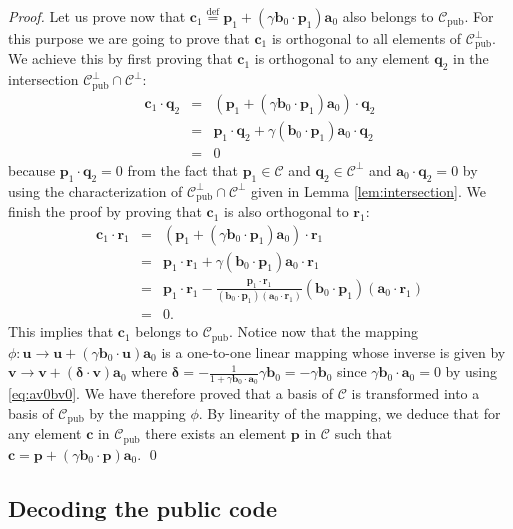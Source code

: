 \documentclass[runningheads,11pt]{llncs}
\newcommand{\eqdef}{\stackrel{\text{def}}{=}}
\newcommand{\code}[1]{\ensuremath{\mathscr{#1}}}
\newcommand{\Cpub}{\code{C}_{\text{pub}}}
\newcommand{\CC}{\code{C}}
\newcommand{\scp}[2]{#1\cdot #2}
\newcommand{\word}[1]{\ensuremath{\boldsymbol{#1}}}
\newcommand{\av}{\word{a}}
\newcommand{\bv}{\word{b}}
\newcommand{\deltav}{\word{\delta}}
\newcommand{\cv}{\word{c}}
\newcommand{\pv}{\word{p}}
\newcommand{\qv}{\word{q}}
\newcommand{\rv}{\word{r}}
\newcommand{\uv}{\word{u}}
\newcommand{\vv}{\word{v}}
\begin{document}
\begin{proof}
Let us prove now that 
$\cv_1 \eqdef \pv_1 + (\scp{\gamma \bv_0}{\pv_1}) \av_0$ also belongs to $\Cpub$.
For this purpose we are going to prove that $\cv_1$ is orthogonal to all elements of 
$\Cpub^\perp$.
We achieve this by first proving that $\cv_1$ is orthogonal to any element $\qv_2$ in the 
intersection $\Cpub^\perp \cap \CC^\perp$:
\begin{eqnarray*}
\scp{\cv_1}{\qv_2} & = & (\scp{\pv_1 + (\scp{\gamma \bv_0}{\pv_1}) \av_0)}{\qv_2}\\
& = & \scp{\pv_1}{\qv_2} + \gamma (\scp{\bv_0}{\pv_1}) \scp{\av_0}{\qv_2} \\
& = & 0
\end{eqnarray*}
because $ \scp{\pv_1}{\qv_2}=0$ from the fact that $\pv_1 \in \CC$ and $\qv_2 \in \CC^\perp$ and
$\scp{\av_0}{\qv_2}=0$ by using the characterization of $\Cpub^\perp \cap \CC^\perp$ given in 
Lemma \ref{lem:intersection}. We finish the proof
by  proving that $\cv_1$ is also orthogonal to $\rv_1$:
\begin{eqnarray*}
\scp{\cv_1}{\rv_1} &= &  \scp{(\pv_1 + (\scp{\gamma \bv_0}{\pv_1})\av_0)}{\rv_1}\\
& = & \scp{\pv_1}{\rv_1} + \gamma (\scp{\bv_0}{\pv_1}) \scp{\av_0}{\rv_1}\\
& = & \scp{\pv_1}{\rv_1} - \frac{ \scp{\pv_1}{\rv_1}}{(\scp{\bv_0}{\pv_1})(\scp{\av_0}{\rv_1})} (\scp{\bv_0}{\pv_1})( \scp{\av_0}{\rv_1})\\
& = & 0.
\end{eqnarray*}
This implies that $\cv_1$ belongs to $\Cpub$. 
Notice now that the mapping 
$\phi :\uv \rightarrow \uv + (\scp{\gamma \bv_0}{\uv})\av_0$ is a one-to-one linear mapping whose inverse is given by
$\vv \rightarrow \vv + (\scp{\deltav}{\vv}) \av_0$ where 
$\deltav = -\frac{1}{1+\scp{\gamma \bv_0}{\av_0}} \gamma \bv_0=-\gamma \bv_0$ since $\scp{\gamma \bv_0}{\av_0}=0$ by using 
\eqref{eq:av0bv0}. We have therefore proved that a basis of $\CC$ is transformed into a basis of $\Cpub$ by the mapping
$\phi$. By linearity of the mapping, we deduce that for any element $\cv$ in $\Cpub$ there
exists an element $\pv$ in $\CC$ such that $\cv = \pv + (\scp{\gamma \bv_0}{\pv} )\av_0$.
\qed
\end{proof}

\subsection{Decoding the public code}\label{ss:breaking_Baldi}
\end{document}

